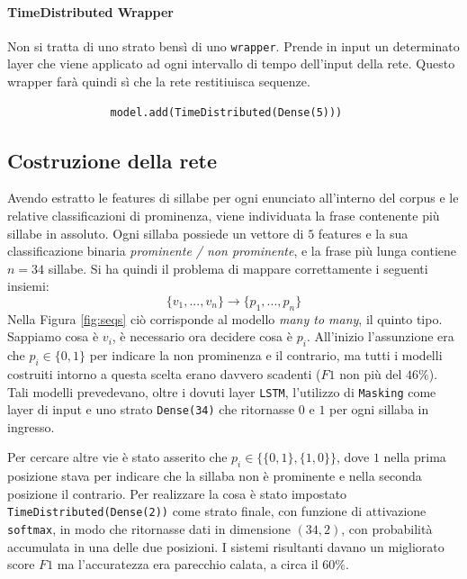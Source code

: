 \documentclass[twoside,twocolumn,10pt]{extarticle}
\theoremstyle{definition}
\begin{document}
	\paragraph{TimeDistributed Wrapper}
		Non si tratta di uno strato bensì di uno \texttt{wrapper}. Prende in input un determinato layer che viene applicato ad ogni intervallo di tempo dell'input della rete. Questo wrapper farà quindi sì che la rete restitiuisca sequenze.
		\begin{center}
			\begin{verbatim}
				model.add(TimeDistributed(Dense(5)))
			\end{verbatim}
		\end{center}
	
	\subsection{Costruzione della rete}
		Avendo estratto le features di sillabe per ogni enunciato all'interno del corpus e le relative classificazioni di prominenza, viene individuata la frase contenente più sillabe in assoluto. Ogni sillaba possiede un vettore di $5$ features e la sua classificazione binaria \textit{prominente / non prominente}, e la frase più lunga contiene $n = 34$ sillabe. Si ha quindi il problema di mappare correttamente i seguenti insiemi:
		\begin{equation}
			\{v_1, ..., v_n\} \rightarrow \{p_1, ..., p_n\}
		\end{equation}
		Nella Figura \ref{fig:seqs} ciò corrisponde al modello \textit{many to many}, il quinto tipo. Sappiamo cosa è $v_i$, è necessario ora decidere cosa è $p_i$. All'inizio l'assunzione era che $p_i \in \{0, 1\}$ per indicare la non prominenza e il contrario, ma tutti i modelli costruiti intorno a questa scelta erano davvero scadenti ($F1$ non più del $46\%$). Tali modelli prevedevano, oltre i dovuti layer \texttt{LSTM}, l'utilizzo di \texttt{Masking} come layer di input e uno strato \texttt{Dense(34)} che ritornasse $0$ e $1$ per ogni sillaba in ingresso.
		
		Per cercare altre vie è stato asserito che $p_i \in \{\{0, 1\}, \{1, 0\}\}$, dove $1$ nella prima posizione stava per indicare che la sillaba non è prominente e nella seconda posizione il contrario. Per realizzare la cosa è stato impostato \texttt{TimeDistributed(Dense(2))} come strato finale, con funzione di attivazione \texttt{softmax}, in modo che ritornasse dati in dimensione $(34, 2)$, con probabilità accumulata in una delle due posizioni. I sistemi risultanti davano un migliorato score $F1$ ma l'accuratezza era parecchio calata, a circa il $60\%$.
		
\end{document}
